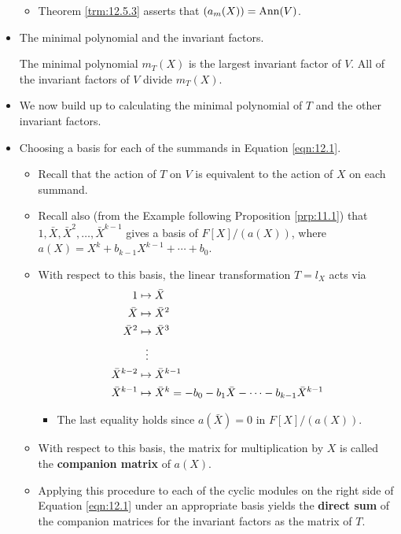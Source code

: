 \documentclass[../notes.tex]{subfiles}
\begin{document}
\begin{itemize}
\begin{itemize}
        \item Theorem \ref{trm:12.5.3} asserts that $(a_m(X))=\operatorname{Ann}(V)$.
    \end{itemize}
    \item The minimal polynomial and the invariant factors.
    \begin{proposition}\label{prp:12.13}
        The minimal polynomial $m_T(X)$ is the largest invariant factor of $V$. All of the invariant factors of $V$ divide $m_T(X)$.
    \end{proposition}
    \item We now build up to calculating the minimal polynomial of $T$ and the other invariant factors.
    \item Choosing a basis for each of the summands in Equation \ref{eqn:12.1}.
    \begin{itemize}
        \item Recall that the action of $T$ on $V$ is equivalent to the action of $X$ on each summand.
        \item Recall also (from the Example following Proposition \ref{prp:11.1}) that $1,\bar{X},\bar{X}^2,\dots,\bar{X}^{k-1}$ gives a basis of $F[X]/(a(X))$, where $a(X)=X^k+b_{k-1}X^{k-1}+\cdots+b_0$.
        \item With respect to this basis, the linear transformation $T=l_X$ acts via
        \begin{align*}
            1 &\mapsto \bar{X}\\
            \bar{X} &\mapsto \bar{X}^2\\
            \bar{X}^2 &\mapsto \bar{X}^3\\
            &\hspace{2.5mm}\vdots\\
            \bar{X}^{k-2} &\mapsto \bar{X}^{k-1}\\
            \bar{X}^{k-1} &\mapsto \bar{X}^k = -b_0-b_1\bar{X}-\cdots-b_{k-1}\bar{X}^{k-1}
        \end{align*}
        \begin{itemize}
            \item The last equality holds since $a(\bar{X})=0$ in $F[X]/(a(X))$.
        \end{itemize}
        \item With respect to this basis, the matrix for multiplication by $X$ is called the \textbf{companion matrix} of $a(X)$.
        \item Applying this procedure to each of the cyclic modules on the right side of Equation \ref{eqn:12.1} under an appropriate basis yields the \textbf{direct sum} of the companion matrices for the invariant factors as the matrix of $T$.

\end{itemize}
\end{itemize}
\end{document}

